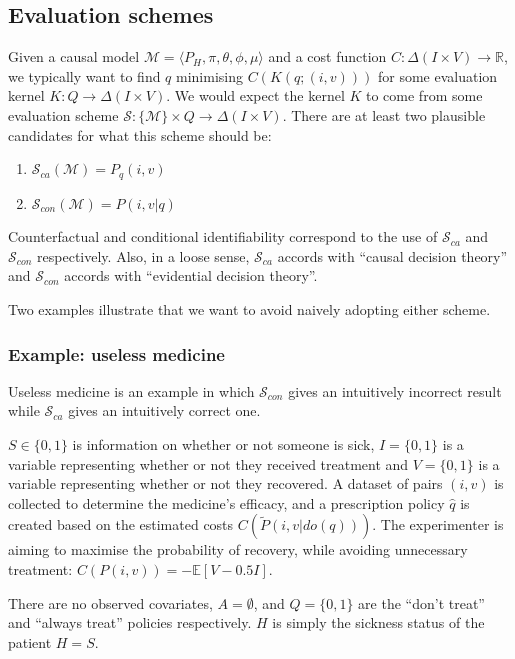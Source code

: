 \subsection{Evaluation schemes}

Given a causal model $\mathscr{M}=\langle P_H, \pi, \theta, \phi, \mu\rangle$ and a cost function $C:\Delta(I\times V)\to \mathbb{R}$, we typically want to find $q$ minimising $C(K(q;(i,v)))$ for some evaluation kernel $K:Q\to \Delta(I\times V)$. We would expect the kernel $K$ to come from some evaluation scheme $\mathscr{S}:\{\mathscr{M}\}\times Q\to \Delta(I\times V)$. There are at least two plausible candidates for what this scheme should be:
\begin{enumerate}
    \item $\mathscr{S}_{ca}(\mathscr{M}) = P_q(i,v)$
    \item $\mathscr{S}_{con}(\mathscr{M})=P(i,v|q)$
\end{enumerate}

Counterfactual and conditional identifiability correspond to the use of $\mathscr{S}_{ca}$ and $\mathscr{S}_{con}$ respectively. Also, in a loose sense, $\mathscr{S}_{ca}$ accords with ``causal decision theory'' and  $\mathscr{S}_{con}$ accords with ``evidential decision theory''.

Two examples illustrate that we want to avoid naively adopting either scheme.

\subsubsection{Example: useless medicine}

Useless medicine is an example in which $\mathcal{S}_{con}$ gives an intuitively incorrect result while $\mathcal{S}_{ca}$ gives an intuitively correct one.

$S\in \{0,1\}$ is information on whether or not someone is sick, $I=\{0,1\}$ is a variable representing whether or not they received treatment and $V=\{0,1\}$ is a variable representing whether or not they recovered. A dataset of pairs $(i,v)$ is collected to determine the medicine's efficacy, and a prescription policy $\hat{q}$ is created based on the estimated costs $C(\tilde{P}(i,v|do(q)))$.  The experimenter is aiming to maximise the probability of recovery, while avoiding unnecessary treatment: $C(P(i,v))=-\mathbb{E}[V-0.5I]$. 

There are no observed covariates, $A=\emptyset$, and $Q=\{0,1\}$ are the ``don't treat'' and ``always treat'' policies respectively. $H$ is simply the sickness status of the patient $H=S$.

